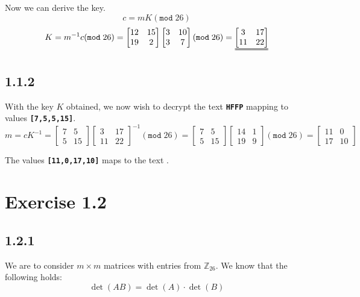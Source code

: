 \documentclass[11pt]{report}
\begin{document}
Now we can derive the key.
$$c = mK (\mathtt{mod}\;26)$$
$$K = m^{-1}c (\mathtt{mod}\;26) = \begin{bmatrix}
		12 & 15\\
		19 & 2
	\end{bmatrix} \begin{bmatrix}
		3 & 10\\
		3 & 7
	\end{bmatrix} (\mathtt{mod}\;26) = \uuline{\begin{bmatrix}
		3 & 17\\
		11 & 22
	\end{bmatrix}}$$


\subsection*{1.1.2}
With the key $K$ obtained, we now wish to decrypt the text {\tt\bfseries HFFP} mapping to values {\tt\bfseries [7,5,5,15]}.
$$m = cK^{-1} = \begin{bmatrix}
		7 & 5\\
		5 & 15
	\end{bmatrix} \begin{bmatrix}
		3 & 17\\
		11 & 22
	\end{bmatrix}^{-1} (\mathtt{mod}\;26) = \begin{bmatrix}
		7 & 5\\
		5 & 15
	\end{bmatrix} \begin{bmatrix}
		14 & 1\\
		19 & 9
	\end{bmatrix} (\mathtt{mod}\;26) = \begin{bmatrix}
		11 & 0\\
		17 & 10
	\end{bmatrix}$$

The values {\tt\bfseries [11,0,17,10]} maps to the text .

\section*{Exercise 1.2}
\subsection*{1.2.1}
We are to consider $m \times m$ matrices with entries from $\mathbb{Z}_{26}$. We know that the following holds:
$$\det(AB)=\det(A) \cdot \det(B)$$
\end{document}
